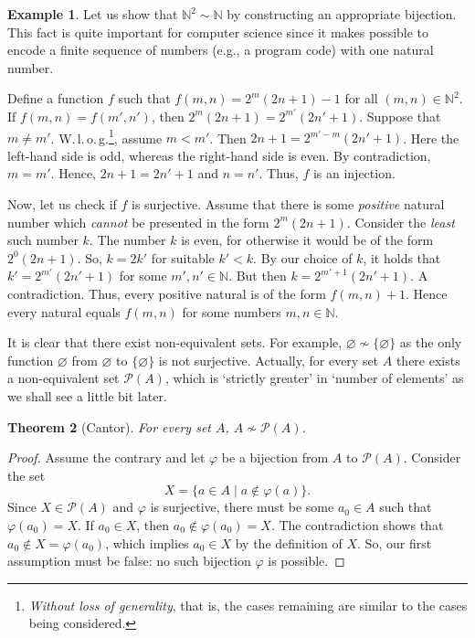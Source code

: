 \documentclass[12pt,notitlepage]{article}
\theoremstyle{plain}
\newtheorem{thm}{Theorem}[section]
\theoremstyle{definition}
\newtheorem{exm}[thm]{Example}
\theoremstyle{plain}
\newcommand{\N}{\mathbb{N}}
\newcommand{\void}{\varnothing}
\newcommand{\mP}{\mathcal{P}}
\renewcommand{\phi}{\varphi}
\newcommand{\1}{\mathbf{1}}
\newcommand{\0}{\mathbf{0}}
\begin{document}
\begin{exm}\label{ch0:N_sq}
Let us show that $\N^2 \sim \N$ by constructing an appropriate bijection. This fact is quite important for computer science since it makes possible to encode a finite sequence of numbers (e.g., a program code) with one natural number.

Define a function $f$ such that $f(m,n) = 2^m(2n + 1) - 1$ for all $(m,n) \in \N^2$. If $f(m,n) = f(m',n')$, then $2^m(2n + 1) = 2^{m'}(2n' + 1)$. Suppose that $m \neq m'$. W.\,l.\,o.\,g.\footnote{\emph{Without loss of generality}, that is, the cases remaining are similar to the cases being considered.}, assume $m < m'$. Then $2n + 1 = 2^{m' - m}(2n' + 1)$. Here the left-hand side is odd, whereas the right-hand side is even. By contradiction, $m = m'$. Hence, $2n + 1 = 2n' + 1$ and $n = n'$. Thus, $f$ is an injection.

Now, let us check if $f$ is surjective. Assume that there is some \emph{positive} natural number which \emph{cannot}  be presented in the form $2^m (2n + 1)$. Consider the \emph{least} such number $k$. The number $k$ is even, for otherwise it would be of the form $2^0 (2n + 1)$. So, $k = 2k'$ for suitable $k' < k$. By our choice of $k$, it holds that $k' = 2^{m'}(2n' + 1)$ for some $m',n' \in \N$. But then $k = 2^{m' + 1}(2n' + 1)$. A contradiction. Thus, every positive natural is of the form $f(m,n) + 1$. Hence every natural equals $f(m,n)$ for some numbers $m,n \in \N$.
\end{exm}

It is clear that there exist non-equivalent sets. For example, $\void \nsim \{ \void \}$ as the only function $\void$ from $\void$ to $\{ \void \}$ is not surjective. Actually, for every set $A$ there exists a non-equivalent set $\mP(A)$, which is `strictly greater' in `number of elements' as we shall see a little bit later.
\begin{thm}[Cantor]\label{L9:t_cantor}
For every set $A$, $A \nsim \mP(A)$.
\end{thm}
\begin{proof}
Assume the contrary and let $\phi$ be a bijection from $A$ to $\mP(A)$. Consider the set
$$X = \{ a \in A \mid a \notin \phi(a) \}.$$
Since $X \in \mP(A)$ and $\phi$ is surjective, there must be some $a_0 \in A$ such that $\phi(a_0) = X$. If $a_0 \in X$, then $a_0 \notin \phi(a_0) = X$. The contradiction shows that $a_0 \notin X = \phi(a_0)$, which implies $a_0 \in X$ by the definition of $X$. So, our first assumption must be false: no such bijection $\phi$ is possible.
\end{proof}
\end{document}
